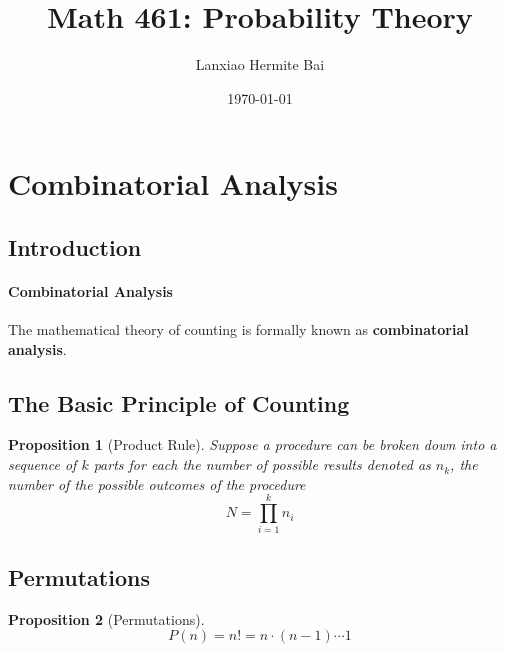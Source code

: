 \documentclass[12pt]{article}
\title{Math 461: Probability Theory}
\author{Lanxiao Hermite Bai}
\date{\today}
\newtheorem{proposition}{Proposition}[subsection]
\begin{document}
\maketitle
\newpage
\newpage
\tableofcontents
\newpage

\section{Combinatorial Analysis}
\subsection{Introduction}
\paragraph{Combinatorial Analysis}
The mathematical theory of counting is formally known as \textbf{combinatorial analysis}.

\subsection{The Basic Principle of Counting}

\begin{proposition}[Product Rule]
    Suppose a procedure can be broken down into a sequence of $k$ parts for each the number of possible results denoted as $n_k$, the number of the possible outcomes of the procedure \[N = \prod^k_{i = 1}n_i\]
\end{proposition}


\subsection{Permutations}
\begin{proposition}[Permutations]
    \begin{equation}
        P(n) = n! = n \cdot (n-1) \cdots 1
    \end{equation}
\end{proposition}
\end{document}
